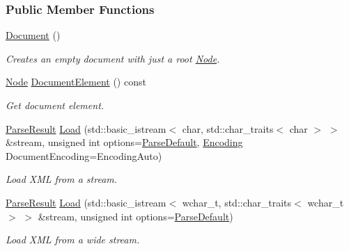 \subsubsection*{Public Member Functions}
\begin{DoxyCompactItemize}
\item 
\hypertarget{classphys_1_1xml_1_1Document_ae1e779f0826bf3357ff77846155aad7d}{
\hyperlink{classphys_1_1xml_1_1Document_ae1e779f0826bf3357ff77846155aad7d}{Document} ()}
\label{classphys_1_1xml_1_1Document_ae1e779f0826bf3357ff77846155aad7d}

\begin{DoxyCompactList}\small\item\em Creates an empty document with just a root \hyperlink{classphys_1_1xml_1_1Node}{Node}. \item\end{DoxyCompactList}\item 
\hyperlink{classphys_1_1xml_1_1Node}{Node} \hyperlink{classphys_1_1xml_1_1Document_a93d8521e3241281e15f77cf7568d5754}{DocumentElement} () const 
\begin{DoxyCompactList}\small\item\em Get document element. \item\end{DoxyCompactList}\item 
\hyperlink{structphys_1_1xml_1_1ParseResult}{ParseResult} \hyperlink{classphys_1_1xml_1_1Document_a9d4ddfd3b987fa3d31d41c06d06a001e}{Load} (std::basic\_\-istream$<$ char, std::char\_\-traits$<$ char $>$ $>$ \&stream, unsigned int options=\hyperlink{namespacephys_1_1xml_aa6b8f7f8c2322fd683a235b498834d60}{ParseDefault}, \hyperlink{namespacephys_1_1xml_a420f5de782438f88160321385bea2015}{Encoding} DocumentEncoding=EncodingAuto)
\begin{DoxyCompactList}\small\item\em Load XML from a stream. \item\end{DoxyCompactList}\item 
\hyperlink{structphys_1_1xml_1_1ParseResult}{ParseResult} \hyperlink{classphys_1_1xml_1_1Document_a5c31cda427eeeb61cd40932f7bec6376}{Load} (std::basic\_\-istream$<$ wchar\_\-t, std::char\_\-traits$<$ wchar\_\-t $>$ $>$ \&stream, unsigned int options=\hyperlink{namespacephys_1_1xml_aa6b8f7f8c2322fd683a235b498834d60}{ParseDefault})
\begin{DoxyCompactList}\small\item\em Load XML from a wide stream. \item\end{DoxyCompactList}\item 

\end{DoxyCompactItemize}
